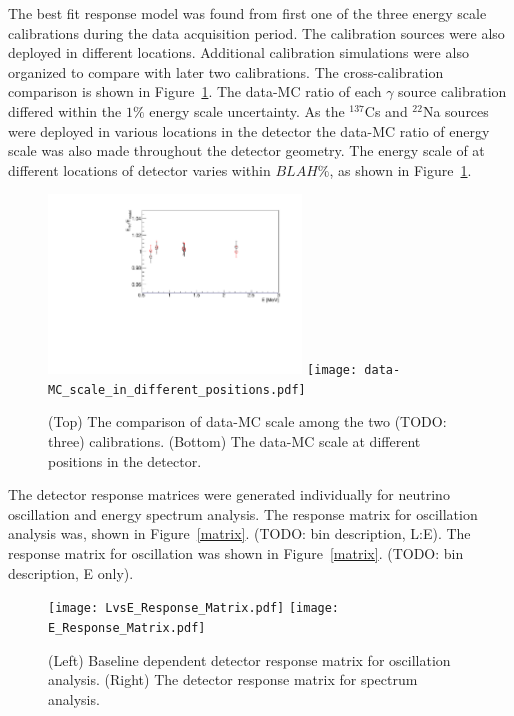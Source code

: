\documentclass{article}
\begin{document}
The best fit response model was found from first one of the three energy scale calibrations during the data acquisition period.
The calibration sources were also deployed in different locations.
Additional calibration simulations were also organized to compare with later two calibrations.
The cross-calibration comparison is shown in Figure~\ref{fig:compare}. 
The data-MC ratio of each $\gamma$ source calibration differed within the $1\%$ energy scale uncertainty.
As the $^{137}$Cs and $^{22}$Na sources were deployed in various locations in the detector the data-MC ratio of energy scale was also made throughout the detector geometry.
The energy scale of at different locations of detector varies within $BLAH\%$, as shown in Figure~\ref{fig:compare}.

\begin{figure}[h!]
\centering
\includegraphics[width=0.6\textwidth]{EScaleCompare.pdf}
\texttt{[image: data-MC\_scale\_in\_different\_positions.pdf]}
\caption{
(Top) The comparison of data-MC scale among the two (TODO: three) calibrations.
(Bottom) The data-MC scale at different positions in the detector.
}
\label{fig:compare}
\end{figure}

The detector response matrices were generated individually for neutrino oscillation and energy spectrum analysis.
The response matrix for oscillation analysis was, shown in Figure~\ref{matrix}. (TODO: bin description, L:E).
The response matrix for oscillation was shown in Figure~\ref{matrix}. (TODO: bin description, E only).

\begin{figure}[h!]
\centering
\texttt{[image: LvsE\_Response\_Matrix.pdf]}
\texttt{[image: E\_Response\_Matrix.pdf]}
\caption{
(Left) Baseline dependent detector response matrix for oscillation analysis.
(Right) The detector response matrix for spectrum analysis.
}
\label{fig:matrix}
\end{figure}
\end{document}
